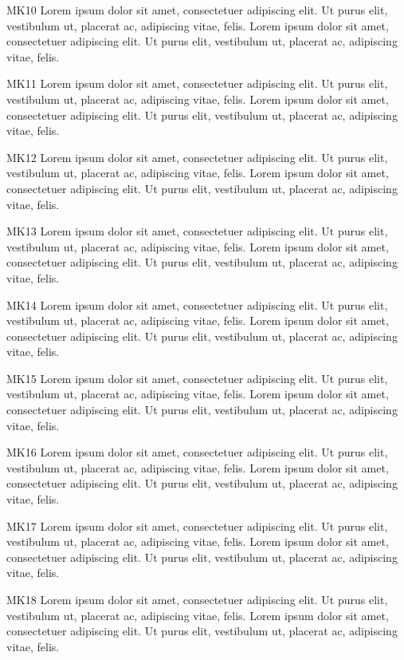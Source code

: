 \documentclass[twocolumn]{article}
\begin{document}
MK10 Lorem ipsum dolor sit amet, consectetuer adipiscing elit. Ut purus elit, vestibulum ut, placerat ac, adipiscing vitae, felis. Lorem ipsum dolor sit amet, consectetuer adipiscing elit. Ut purus elit, vestibulum ut, placerat ac, adipiscing vitae, felis.\par
{}MK11 Lorem ipsum dolor sit amet, consectetuer adipiscing elit. Ut purus elit, vestibulum ut, placerat ac, adipiscing vitae, felis. Lorem ipsum dolor sit amet, consectetuer adipiscing elit. Ut purus elit, vestibulum ut, placerat ac, adipiscing vitae, felis.\par
{}MK12 Lorem ipsum dolor sit amet, consectetuer adipiscing elit. Ut purus elit, vestibulum ut, placerat ac, adipiscing vitae, felis. Lorem ipsum dolor sit amet, consectetuer adipiscing elit. Ut purus elit, vestibulum ut, placerat ac, adipiscing vitae, felis.\par
{}MK13 Lorem ipsum dolor sit amet, consectetuer adipiscing elit. Ut purus elit, vestibulum ut, placerat ac, adipiscing vitae, felis. Lorem ipsum dolor sit amet, consectetuer adipiscing elit. Ut purus elit, vestibulum ut, placerat ac, adipiscing vitae, felis.\par
{}MK14 Lorem ipsum dolor sit amet, consectetuer adipiscing elit. Ut purus elit, vestibulum ut, placerat ac, adipiscing vitae, felis. Lorem ipsum dolor sit amet, consectetuer adipiscing elit. Ut purus elit, vestibulum ut, placerat ac, adipiscing vitae, felis.\par
{}MK15 Lorem ipsum dolor sit amet, consectetuer adipiscing elit. Ut purus elit, vestibulum ut, placerat ac, adipiscing vitae, felis. Lorem ipsum dolor sit amet, consectetuer adipiscing elit. Ut purus elit, vestibulum ut, placerat ac, adipiscing vitae, felis.\par
{}MK16 Lorem ipsum dolor sit amet, consectetuer adipiscing elit. Ut purus elit, vestibulum ut, placerat ac, adipiscing vitae, felis. Lorem ipsum dolor sit amet, consectetuer adipiscing elit. Ut purus elit, vestibulum ut, placerat ac, adipiscing vitae, felis.\par
{}MK17 Lorem ipsum dolor sit amet, consectetuer adipiscing elit. Ut purus elit, vestibulum ut, placerat ac, adipiscing vitae, felis. Lorem ipsum dolor sit amet, consectetuer adipiscing elit. Ut purus elit, vestibulum ut, placerat ac, adipiscing vitae, felis.\par
{}
MK18 Lorem ipsum dolor sit amet, consectetuer adipiscing elit. Ut purus elit, vestibulum ut, placerat ac, adipiscing vitae, felis. Lorem ipsum dolor sit amet, consectetuer adipiscing elit. Ut purus elit, vestibulum ut, placerat ac, adipiscing vitae, felis.\par
\end{document}
